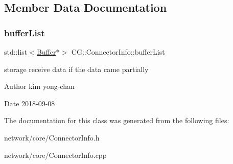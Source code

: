 \subsection{Member Data Documentation}
\mbox{\label{class_c_g_1_1_connector_info_a29bcb8d076ad5909c38bc7b91d5468ea}} 
\subsubsection{\texorpdfstring{buffer\+List}{bufferList}}
{\footnotesize\ttfamily std\+::list$<$\mbox{\hyperlink{class_c_g_1_1_buffer}{Buffer}}$\ast$$>$ C\+G\+::\+Connector\+Info\+::buffer\+List\hspace{0.3cm}{\ttfamily [protected]}}



storage receive data if the data came partially 

\begin{DoxyAuthor}{Author}
kim yong-\/chan 
\end{DoxyAuthor}
\begin{DoxyDate}{Date}
2018-\/09-\/08 
\end{DoxyDate}


The documentation for this class was generated from the following files\+:\begin{DoxyCompactItemize}
\item 
network/core/Connector\+Info.\+h\item 
network/core/Connector\+Info.\+cpp\end{DoxyCompactItemize}
